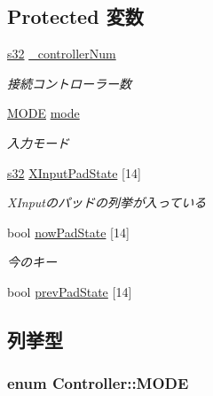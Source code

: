 \subsection*{Protected 変数}
\begin{DoxyCompactItemize}
\item 
\hyperlink{_main_8h_a0ce6887c26c1c49ad3be5710dd42bfd6}{s32} \hyperlink{class_controller_a40591e6b5b1f2ffdb426c9cb5d235119}{\-\_\-controller\-Num}
\begin{DoxyCompactList}\small\item\em 接続コントローラー数 \end{DoxyCompactList}\item 
\hyperlink{class_controller_af394a131031afd0ad34914735d9377a4}{M\-O\-D\-E} \hyperlink{class_controller_a3164e8d5c0e403be2b8b4ca6cb5c1360}{mode}
\begin{DoxyCompactList}\small\item\em 入力モード \end{DoxyCompactList}\item 
\hyperlink{_main_8h_a0ce6887c26c1c49ad3be5710dd42bfd6}{s32} \hyperlink{class_controller_a80605df285276d88908693110844ea77}{X\-Input\-Pad\-State} \mbox{[}14\mbox{]}
\begin{DoxyCompactList}\small\item\em X\-Inputのパッドの列挙が入っている \end{DoxyCompactList}\item 
bool \hyperlink{class_controller_a0dd236e65ec6bdb486165e0fd83e065e}{now\-Pad\-State} \mbox{[}14\mbox{]}
\begin{DoxyCompactList}\small\item\em 今のキー \end{DoxyCompactList}\item 
bool \hyperlink{class_controller_a95bfdb374295856d3152e7a6ec338b89}{prev\-Pad\-State} \mbox{[}14\mbox{]}
\end{DoxyCompactItemize}


\subsection{列挙型}
\hypertarget{class_controller_af394a131031afd0ad34914735d9377a4}{
\subsubsection[{M\-O\-D\-E}]{\setlength{\rightskip}{0pt plus 5cm}enum {\bf Controller\-::\-M\-O\-D\-E}}}\label{class_controller_af394a131031afd0ad34914735d9377a4}



